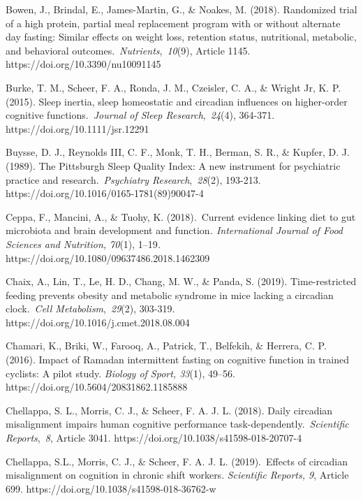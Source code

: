 \documentclass[authordate, empirical]{jote-new-article}
\begin{document}
Bowen, J., Brindal, E., James-Martin, G., \& Noakes, M. (2018). Randomized trial of a high protein, partial meal replacement program with or without alternate day fasting: Similar effects on weight loss, retention status, nutritional, metabolic, and behavioral outcomes. \emph{Nutrients}, \emph{10}(9), Article 1145. https://doi.org/10.3390/nu10091145



Burke, T. M., Scheer, F. A., Ronda, J. M., Czeisler, C. A., \& Wright Jr, K. P. (2015). Sleep inertia, sleep homeostatic and circadian influences on higher-order cognitive functions. \emph{Journal of Sleep Research}, \emph{24}(4), 364-371. https://doi.org/10.1111/jsr.12291



Buysse, D. J., Reynolds III, C. F., Monk, T. H., Berman, S. R., \& Kupfer, D. J. (1989). The Pittsburgh Sleep Quality Index: A new instrument for psychiatric practice and research. \emph{Psychiatry Research}, \emph{28}(2), 193-213. https://doi.org/10.1016/0165-1781(89)90047-4



Ceppa, F., Mancini, A., \& Tuohy, K. (2018). Current evidence linking diet to gut microbiota and brain development and function\emph{. International Journal of Food Sciences and Nutrition, 70}(1),\emph{ }1--19\emph{. }https://doi.org/10.1080/09637486.2018.1462309



Chaix, A., Lin, T., Le, H. D., Chang, M. W., \& Panda, S. (2019). Time-restricted feeding prevents obesity and metabolic syndrome in mice lacking a circadian clock. \emph{Cell Metabolism}, \emph{29}(2), 303-319. https://doi.org/10.1016/j.cmet.2018.08.004



Chamari, K., Briki, W., Farooq, A., Patrick, T., Belfekih, \& Herrera, C. P. (2016). Impact of Ramadan intermittent fasting on cognitive function in trained cyclists: A pilot study. \emph{Biology of Sport, 33}(1), 49--56. https://doi.org/10.5604/20831862.1185888



Chellappa, S. L., Morris, C. J., \& Scheer, F. A. J. L. (2018). Daily circadian misalignment impairs human cognitive performance task-dependently. \emph{Scientific Reports}, \emph{8}, Article 3041. https://doi.org/10.1038/s41598-018-20707-4



Chellappa, S.L., Morris, C. J., \& Scheer, F. A. J. L. (2019). Effects of circadian misalignment on cognition in chronic shift workers.\emph{ Scientific Reports, 9}, Article 699. https://doi.org/10.1038/s41598-018-36762-w
\end{document}
